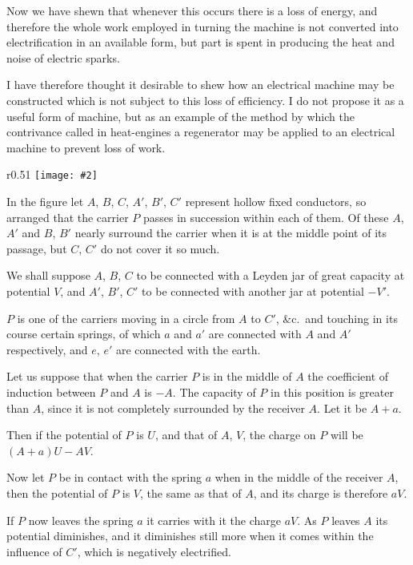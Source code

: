 \documentclass[12pt,oneside]{book}[2021/10/04]
\newcommand{\Runhead}[1]{\fancyhead[C]{\iffloatpage{}{\small#1}}}
\newcommand{\wrapfig}[3]{
\begin{wrapfigure}{r}{#1\textwidth}
\centering
\texttt{[image: \#2]}
\caption*{\small #3}
\end{wrapfigure}}
\newcommand{\¬}{\hphantom{0}}
\begin{document}
Now we have shewn that whenever this occurs there is a loss
of energy, and therefore the whole work employed in turning the
machine is not converted into electrification in an available form,
but part is spent in producing the heat and noise of electric
sparks.
\Runhead{MACHINE WITHOUT SPARKS.}

I have therefore thought it desirable to shew how an electrical
machine may be constructed which is not subject to this loss of
efficiency. I do not propose it as a useful form of machine, but
as an example of the method by which the contrivance called in
heat-engines a regenerator may be applied to an electrical machine
to prevent loss of work.

\wrapfig{0.51}{181.png}{Fig. 42.}
In the figure let \(A\), \(B\), \(C\), \(A'\), \(B'\), \(C'\) represent hollow fixed
conductors, so arranged that the carrier \(P\) passes in succession
within each of them. Of these \(A\), \(A'\) and \(B\), \(B'\) nearly surround the
carrier when it is at the middle point of its passage, but \(C\), \(C'\) do not
cover it so much.

We shall suppose \(A\), \(B\), \(C\) to be connected with a Leyden jar
of great capacity at potential \(V\), and \(A'\), \(B'\), \(C'\) to be connected with
another jar at potential \(-V'\).

\(P\) is one of the carriers moving in a circle from \(A\) to \(C'\), \&c.\
and touching in its course certain
springs, of which \(a\) and
\(a'\) are connected with \(A\) and \(A'\)
respectively, and \(e\), \(e'\) are connected
with the earth.

Let us suppose that when
the carrier \(P\) is in the middle
of \(A\) the coefficient of induction
between \(P\) and \(A\) is \(-A\). The
capacity of \(P\) in this position
is greater than \(A\), since it is not
completely surrounded by the
receiver \(A\). Let it be \(A + a\).

Then if the potential of \(P\) is \(U\), and that of \(A\), \(V\), the charge
on \(P\) will be \(( A + a )U - AV\).

Now let \(P\) be in contact with the spring \(a\) when in the middle
of the receiver \(A\), then the potential of \(P\) is \(V\), the same as that
of \(A\), and its charge is therefore \(aV\).

If \(P\) now leaves the spring \(a\) it carries with it the charge \(aV\).
As \(P\) leaves \(A\) its potential diminishes, and it diminishes still more
when it comes within the influence of \(C'\), which is negatively
electrified.
\end{document}
